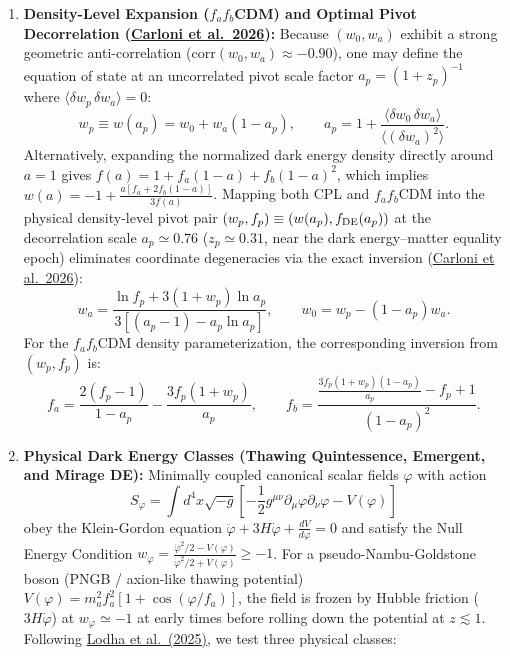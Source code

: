 \documentclass[11pt,letterpaper]{article}
\begin{document}
\begin{enumerate}
    \item \textbf{Density-Level Expansion ($f_a f_b$CDM) and Optimal Pivot Decorrelation (\href{https://arxiv.org/pdf/2608.01215}{Carloni et al.\ 2026}):} Because $(w_0, w_a)$ exhibit a strong geometric anti-correlation ($\text{corr}(w_0, w_a) \approx -0.90$), one may define the equation of state at an uncorrelated pivot scale factor $a_p = (1 + z_p)^{-1}$ where $\langle \delta w_p\, \delta w_a \rangle = 0$:
    \begin{equation}
        w_p \equiv w(a_p) = w_0 + w_a (1 - a_p), \qquad a_p = 1 + \frac{\langle \delta w_0\, \delta w_a \rangle}{\langle (\delta w_a)^2 \rangle}.
        \label{eq:pivot_wp}
    \end{equation}
    Alternatively, expanding the normalized dark energy density directly around $a=1$ gives $f(a) = 1 + f_a(1-a) + f_b(1-a)^2$, which implies $w(a) = -1 + \frac{a[f_a + 2f_b(1-a)]}{3f(a)}$. Mapping both CPL and $f_a f_b$CDM into the physical density-level pivot pair $(w_p, f_p) \equiv (w(a_p), f_{\rm DE}(a_p))$ at the decorrelation scale $a_p \simeq 0.76$ ($z_p \simeq 0.31$, near the dark energy--matter equality epoch) eliminates coordinate degeneracies via the exact inversion (\href{https://arxiv.org/pdf/2608.01215}{Carloni et al.\ 2026}):
    \begin{equation}
        w_a = \frac{\ln f_p + 3(1 + w_p)\ln a_p}{3\left[(a_p - 1) - a_p \ln a_p\right]}, \qquad w_0 = w_p - (1 - a_p)w_a.
        \label{eq:pivot_density}
    \end{equation}
    For the $f_a f_b$CDM density parameterization, the corresponding inversion from $(w_p, f_p)$ is:
    \begin{equation}
        f_a = \frac{2(f_p - 1)}{1 - a_p} - \frac{3 f_p (1 + w_p)}{a_p}, \qquad f_b = \frac{\frac{3 f_p (1 + w_p)(1 - a_p)}{a_p} - f_p + 1}{(1 - a_p)^2}.
        \label{eq:fafb_inversion}
    \end{equation}
    \item \textbf{Physical Dark Energy Classes (Thawing Quintessence, Emergent, and Mirage DE):} Minimally coupled canonical scalar fields $\varphi$ with action
    \begin{equation}
        S_\varphi = \int d^4x \sqrt{-g} \left[ -\frac{1}{2}g^{\mu\nu}\partial_\mu\varphi\partial_\nu\varphi - V(\varphi) \right]
        \label{eq:quintessence_action}
    \end{equation}
    obey the Klein-Gordon equation $\ddot{\varphi} + 3H\dot{\varphi} + \frac{dV}{d\varphi} = 0$ and satisfy the Null Energy Condition $w_\varphi = \frac{\dot{\varphi}^2/2 - V(\varphi)}{\dot{\varphi}^2/2 + V(\varphi)} \ge -1$. For a pseudo-Nambu-Goldstone boson (PNGB / axion-like thawing potential) $V(\varphi) = m_a^2 f_a^2 [1 + \cos(\varphi/f_a)]$, the field is frozen by Hubble friction ($3H\dot{\varphi}$) at $w_\varphi \simeq -1$ at early times before rolling down the potential at $z \lesssim 1$. Following \href{https://arxiv.org/abs/2503.14743}{Lodha et al.\ (2025)}, we test three physical classes:

\end{enumerate}
\end{document}
